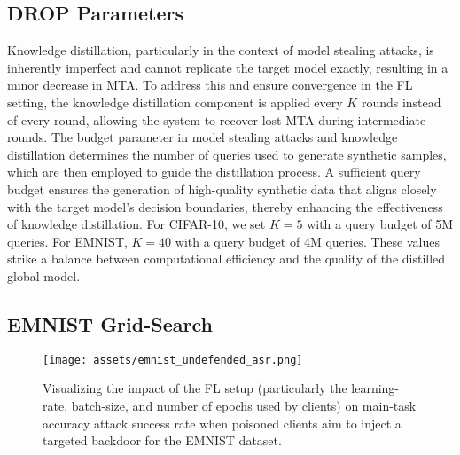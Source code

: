 \subsection{DROP Parameters}
\label{sec:drop_params}


Knowledge distillation, particularly in the context of model stealing attacks, is inherently imperfect and cannot replicate the target model exactly, resulting in a minor decrease in MTA. To address this and ensure convergence in the FL setting, the knowledge distillation component is applied every \(K\) rounds instead of every round, allowing the system to recover lost MTA during intermediate rounds. The budget parameter in model stealing attacks and knowledge distillation determines the number of queries used to generate synthetic samples, which are then employed to guide the distillation process. A sufficient query budget ensures the generation of high-quality synthetic data that aligns closely with the target model’s decision boundaries, thereby enhancing the effectiveness of knowledge distillation. For CIFAR-10, we set \(K = 5\) with a query budget of 5M queries. For EMNIST, \(K = 40\) with a query budget of 4M queries. These values strike a balance between computational efficiency and the quality of the distilled global model.


\subsection{EMNIST Grid-Search}

\begin{figure}[ht]
    \texttt{[image: assets/emnist\_undefended\_asr.png]}
    \caption{Visualizing the impact of the FL setup (particularly the learning-rate, batch-size, and number of epochs used by clients) on main-task accuracy attack success rate when poisoned clients aim to inject a targeted backdoor for the EMNIST dataset.}
    \label{fig:fl_setup_impact_emnist}
\end{figure}


